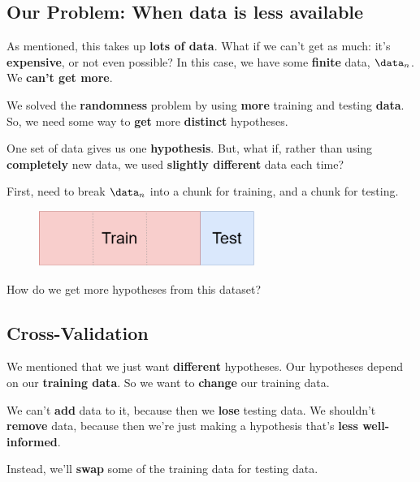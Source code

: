     \subsection{Our Problem: When data is less available}
        
        As mentioned, this takes up \textbf{lots of data}. What if we can't get as much: it's \textbf{expensive}, or not even possible? In this case, we have some \textbf{finite} data, $\data_n$. We \textbf{can't get more}.
        
        We solved the \textbf{randomness} problem by using \textbf{more} training and testing \textbf{data}. So, we need some way to \textbf{get} more \textbf{distinct} hypotheses.
        
        One set of data gives us one \textbf{hypothesis}. But, what if, rather than using \textbf{completely} new data, we used \textbf{slightly different} data each time?
        
        First, need to break $\data_n$ into a chunk for training, and a chunk for testing.
        
        \begin{figure}[H]
        \centering
            \includegraphics[width=70mm,scale=0.5]{images/regression_images/training_and_test_data.png}
        \end{figure}
        
        How do we get more hypotheses from this dataset?
        
    \subsection{Cross-Validation}
    
        We mentioned that we just want \textbf{different} hypotheses. Our hypotheses depend on our \textbf{training data}. So we want to \textbf{change} our training data.
        
        We can't \textbf{add} data to it, because then we \textbf{lose} testing data. We shouldn't \textbf{remove} data, because then we're just making a hypothesis that's \textbf{less well-informed}.
        
        Instead, we'll \textbf{swap} some of the training data for testing data.
        
